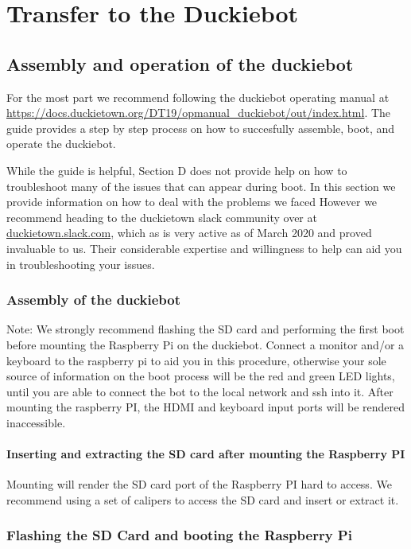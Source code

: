 \chapter{Transfer to the Duckiebot}

\section{Assembly and operation of the duckiebot}

For the most part we recommend following the duckiebot operating manual at \url{https://docs.duckietown.org/DT19/opmanual\_duckiebot/out/index.html}.
The guide provides a step by step process on how to succesfully assemble, boot, and operate the duckiebot.

While the guide is helpful, Section D does not provide help on how to troubleshoot many of the issues that can appear during boot. In this section we provide information on how to deal with the problems we faced However we recommend heading to the duckietown slack community over at \url{duckietown.slack.com}, which as is very active as of March 2020 and proved invaluable to us. Their considerable expertise and willingness to help can aid you in troubleshooting your issues.

\subsection{Assembly of the duckiebot}

Note: We strongly recommend flashing the SD card and performing the first boot before mounting the Raspberry Pi on the duckiebot. Connect a monitor and/or a keyboard to the raspberry pi to aid you in this procedure, otherwise your sole source of information on the boot process will be the red and green LED lights, until you are able to connect the bot to the local network and ssh into it. After mounting the raspberry PI, the HDMI and keyboard input ports will be rendered inaccessible.

\subsubsection{Inserting and extracting the SD card after mounting the Raspberry PI}

Mounting will render the SD card port of the Raspberry PI hard to access. We recommend using a set of calipers to access the SD card and insert or extract it.


\subsection{Flashing the SD Card and booting the Raspberry Pi}

